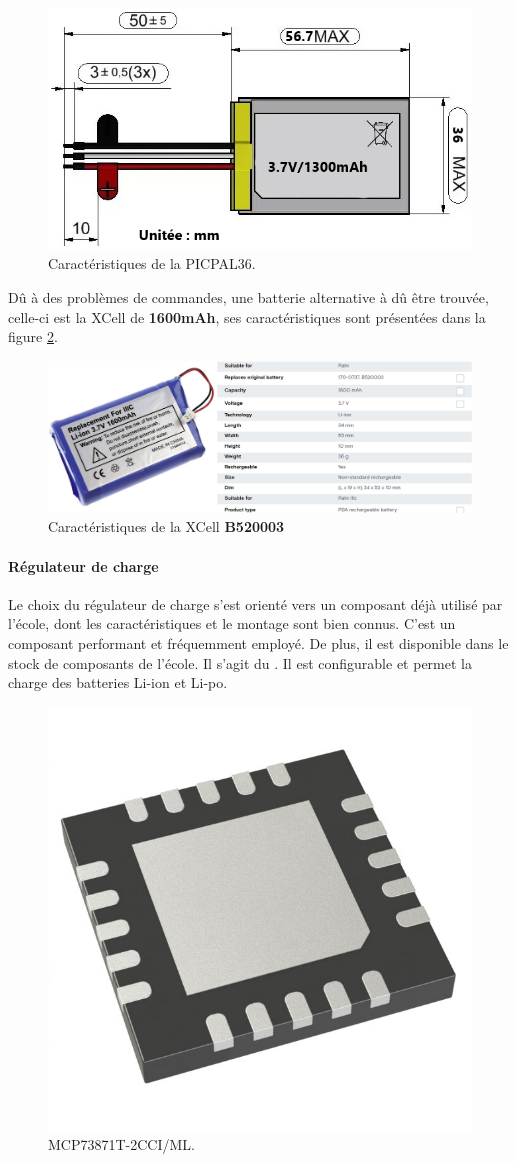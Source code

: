 \clearpage

\begin{figure}[!h]
	\centering
	\includegraphics[width=.8\linewidth]{../figures/pre_etude/batt}
	\caption{Caractéristiques de la PICPAL36.}
	\label{fig:batt}
\end{figure}

Dû à des problèmes de commandes, une batterie alternative à dû être trouvée, celle-ci est la XCell  de \textbf{1600mAh}, ses caractéristiques sont présentées dans la figure \ref{fig:batt2}.

\begin{figure}[h]
	\centering
	\includegraphics[width=.8\linewidth]{../figures/pre_etude/batt2}
	\caption{Caractéristiques de la XCell \textbf{B520003}}
	\label{fig:batt2}
\end{figure}



\paragraph{Régulateur de charge} Le choix du régulateur de charge s'est orienté vers un composant déjà utilisé par l'école, dont les caractéristiques et le montage sont bien connus. C'est un composant performant et fréquemment employé. De plus, il est disponible dans le stock de composants de l'école. Il s'agit du . Il est configurable et permet la charge des batteries Li-ion et Li-po.

\begin{figure}[h]
	\centering
	\includegraphics[width=0.2\linewidth]{../figures/pre_etude/MCP}
	\caption{MCP73871T-2CCI/ML.}
	\label{fig:mcp}
\end{figure}

